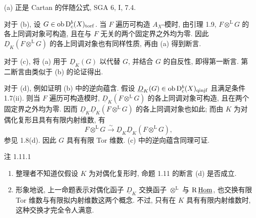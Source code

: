 \begin{prooftext}
(a) 正是 Cartan 的伴随公式, SGA 6, I, 7.4.

对于 (b), 设 $G\in\operatorname{ob}\mathrm{D}_c^b(X)_{\mathrm{torf}}$. 当 $F$ 遍历可构造 $A_X$-模时, 由引理 1.9, $F\otimes^{\mathrm L}G$ 的各上同调对象可构造, 且在与 $F$ 无关的两个固定界之外均为零. 因此 $\underline D_K(F\otimes^{\mathrm L}G)$ 的各上同调对象也有同样性质, 再由 (a) 得到断言.

对于 (c), 将 (a) 用于 $\underline D_K(G)$ 以代替 $G$, 并结合 $G$ 的自反性, 即得第一断言. 第二断言由类似于 (b) 的论证得出.

对于 (d), 例如证明 (b) 中的逆向蕴含. 假设 $\underline D_K(G)\in\operatorname{ob}\mathrm{D}_c^b(X)_{\mathrm{qinjf}}$ 且满足条件 1.7(ii). 则当 $F$ 遍历可构造模时, $\underline D_K(F\otimes^{\mathrm L}G)$ 的各上同调对象可构造, 且在两个固定界之外均为零. 因而 $\underline D_K\underline D_K(F\otimes^{\mathrm L}G)$ 的各上同调对象也如此; 而由 $K$ 为对偶化复形且具有有限内射维数, 有
\[
   F\otimes^{\mathrm L}G\xrightarrow{\sim}\underline D_K\underline D_K(F\otimes^{\mathrm L}G),
\]
参见 1.8(d). 因此 $G$ 具有有限 Tor 维数. (c) 中的逆向蕴含同理可证. \qedtext
\end{prooftext}

\begin{statement}{注 1.11.1}
\begin{enumerate}[label=\alph*)]
\item 整理者不知道仅假设 $K$ 为对偶化复形时, 命题 1.11 的断言 (d) 是否成立.
\item 形象地说, 上一命题表示对偶化函子 $\underline D_K$ 交换函子 $\otimes^{\mathrm L}$ 与 $\mathrm R\,\underline{\operatorname{Hom}}$, 也交换有限 Tor 维数与有限拟内射维数这两个概念. 不过, 只有在 $K$ 具有有限内射维数时, 这种交换才完全令人满意.
\end{enumerate}
\end{statement}

